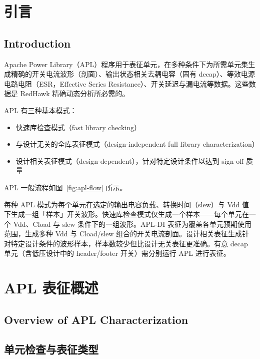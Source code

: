 ﻿%
\label{chap:apl}

\section{引言}
\subsection*{Introduction}

Apache Power Library（APL）程序用于表征单元，在多种条件下为所需单元集生成精确的开关电流波形（剖面）、输出状态相关去耦电容（固有 decap）、等效电源电路电阻（ESR，Effective Series Resistance）、开关延迟与漏电流等数据。这些数据是 RedHawk 精确动态分析所必需的。

APL 有三种基本模式：
\begin{itemize}
  \item 快速库检查模式（fast library checking）
  \item 与设计无关的全库表征模式（design-independent full library characterization）
  \item 设计相关表征模式（design-dependent），针对特定设计条件以达到 sign-off 质量
\end{itemize}

APL 一般流程如图~\ref{fig:apl-flow} 所示。


每种 APL 模式为每个单元在选定的输出电容负载、转换时间（slew）与 Vdd 值下生成一组「样本」开关波形。快速库检查模式仅生成一个样本——每个单元在一个 Vdd、Cload 与 slew 条件下的一组波形。APL-DI 表征为覆盖各单元预期使用范围，生成多种 Vdd 与 Cload/slew 组合的开关电流剖面。设计相关表征生成针对特定设计条件的波形样本，样本数较少但比设计无关表征更准确。有意 decap 单元（含低压设计中的 header/footer 开关）需分别运行 APL 进行表征。

\section{APL 表征概述}
\subsection*{Overview of APL Characterization}

\subsection{单元检查与表征类型}
